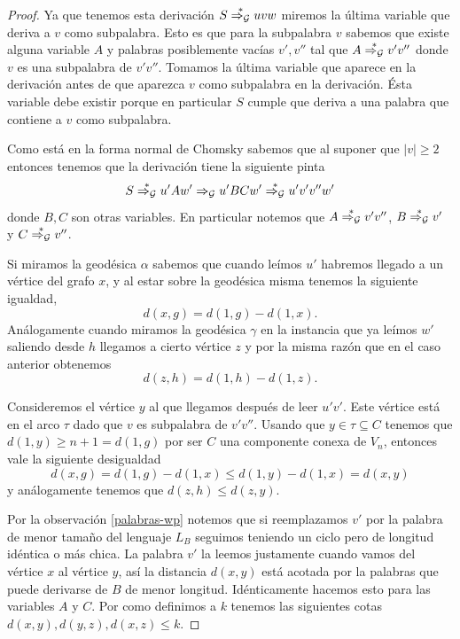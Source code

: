 \documentclass[tesis.tex]{subfiles}
\begin{document}
\begin{proof}
	Ya que tenemos esta derivación $S \overset{*}{\Rightarrow_{\cal G}} uvw$ miremos la última variable que deriva a $v$ como subpalabra. 
	Esto es que para la subpalabra $v$ sabemos que existe alguna variable $A$ y palabras posiblemente vacías $v',v''$ tal que $A \overset{*}{\Rightarrow_{\cal G}} v'v''$ donde $v$ es una subpalabra de $v'v''$. 
	Tomamos la última variable que aparece en la derivación antes de que aparezca $v$ como subpalabra en la derivación.
	Ésta variable debe existir porque en particular $S$ cumple que deriva a una palabra que contiene a $v$ como subpalabra.
	
	Como está en la forma normal de Chomsky sabemos que al suponer que $|v| \ge 2$ entonces tenemos que la derivación tiene la siguiente pinta
	\begin{equation*}
		S \overset{*}{\Rightarrow_{\cal G}} u'Aw' \Rightarrow_{\cal G} u'BC w' \overset{*}{\Rightarrow_{\cal G}} u'v'v''w'
	\end{equation*}
	donde $B,C$ son otras variables. 
	En particular notemos que $A \overset{*}{\Rightarrow_{\cal G}} v'v''$, $B \overset{*}{\Rightarrow_{\cal G}} v'$ y $C \overset{*}{\Rightarrow_{\cal G}} v''$.
	
	
	Si miramos la geodésica $\alpha$ sabemos que cuando leímos $u'$ habremos llegado a un vértice del grafo $x$, y al estar sobre la geodésica misma tenemos la siguiente igualdad,
	\begin{equation*}
		d(x,g) = d(1,g) - d(1,x).
	\end{equation*}
	Análogamente cuando miramos la geodésica $\gamma$ en la instancia que ya leímos $w'$ saliendo desde $h$ llegamos a cierto vértice $z$ y por la misma razón que en el caso anterior obtenemos
	\begin{equation*}
		d(z,h) = d(1,h) - d(1,z).
	\end{equation*}

	Consideremos el vértice $y$ al que llegamos después de leer $u'v'$.
	Este vértice está en el arco $\tau$ dado que $v$ es subpalabra de $v'v''$.
	Usando que $y \in \tau \subseteq C $ tenemos que $d(1,y) \ge n+1 = d(1,g)$ por ser $C$ una componente conexa de $V_n$, entonces vale la siguiente desigualdad
	\begin{equation*}
		d(x,g) = d(1,g) - d(1,x) \le d(1,y) - d(1,x) = d(x,y)
	\end{equation*}
	y análogamente tenemos que $d(z,h) \le d(z,y)$.
	
	
	Por la observación \ref{palabras-wp} notemos que si reemplazamos $v'$ por la palabra de menor tamaño del lenguaje $L_B$ seguimos teniendo un ciclo pero de longitud idéntica o más chica. 
	La palabra $v'$ la leemos justamente cuando vamos del vértice $x$ al vértice $y$, así la distancia  $d(x,y)$ está acotada por la palabras que puede derivarse de $B$ de menor longitud. 
	Idénticamente hacemos esto para las variables $A$ y $C$.
	Por como definimos a $k$ tenemos las siguientes cotas $d(x,y), d(y,z), d(x,z) \le k$.
	

\end{proof}
\end{document}
